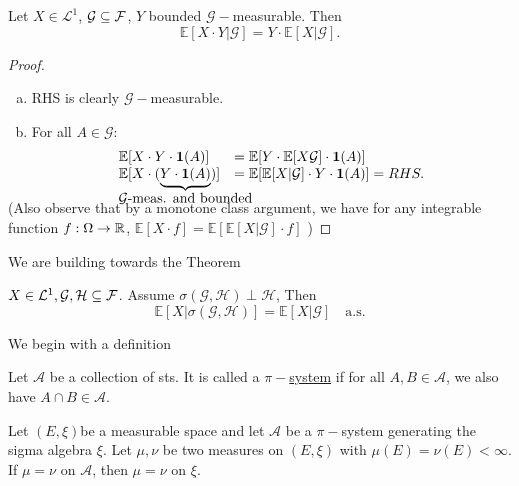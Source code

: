 \documentclass{article}
\begin{document}
\begin{boxprop}\label{prop: meas factorisation cond exp}
Let $ X\in\mathcal{L}^{1}$, $\mathcal{G}\subseteq \mathcal{F}$, $ Y$ bounded $\mathcal{G}-$measurable. Then 
\[
	\mathbb{E}[X\cdot Y|\mathcal{G}] =  Y\cdot\mathbb{E}[X|\mathcal{G}].
\]

\end{boxprop}


\begin{proof}
	\begin{enumerate}[(a)]
		\item RHS is clearly $\mathcal{G}-$measurable.
		\item For all $ A\in\mathcal{G}$: 
			\[
			\begin{array}{ll}
				\mathbb{E}[X\cdot Y\cdot \mathbf{1}(A)] &=\mathbb{E}[Y\cdot\mathbb{E}[X\mathcal{G}]\cdot\mathbf{1}(A)] \\
				\mathbb{E}[X\cdot (\smash{\underbrace{Y\cdot\mathbf{1}(A)}_{\makebox[0pt]{$\mathcal{G}$-\text{meas. and bounded}}}})]&=\mathbb{E}[\mathbb{E}[X|\mathcal{G}]\cdot Y\cdot\mathbf{1}(A)]=RHS.
			\end{array}
			\]
			
    \end{enumerate}
    \vspace{1em} 
(Also observe that by a monotone class argument, we have for any integrable function $ f:\Omega \to \mathbb{R}$, $\mathbb{E}[X\cdot f] =\mathbb{E}[\mathbb{E}[X|\mathcal{ G}]\cdot f] $ ) 
\end{proof}



We are building towards the Theorem
\begin{theorem}\label{thm: cond expectation sigma indep}
$ X\in \mathcal{L}^1, \mathcal{G}, \mathcal{H} \subseteq \mathcal{F}$. Assume $ \sigma( \mathcal{G}, \mathcal{H})\perp \mathcal{H}$, Then
\[
	\mathbb{E}[X|\sigma( \mathcal{G}, \mathcal{H})] =\mathbb{E}[X| \mathcal{G}] \quad \text{a.s.}
\]

\end{theorem}


We begin with a definition
\begin{boxdef}\label{def: pi system}
	Let $ \mathcal{A} $ be a collection of sts. It is called a \underline{$ \pi-$system} if for all $ A,B\in \mathcal{A}$, we also have $ A\cap B\in \mathcal{A}$.
\end{boxdef}


\begin{theorem}\label{thm: uniqueness meas extension}
Let $ (E, \xi)$be a measurable space and let $ \mathcal{A}$ be a $ \pi-$system generating the sigma algebra $ \xi$. Let $ \mu, \nu$ be two measures on $ (E, \xi)$ with $ \mu(E)=\nu(E)<\infty$. If $ \mu = \nu$ on $ \mathcal{A}$, then $ \mu = \nu$ on $ \xi$.
\end{theorem}
\end{document}
